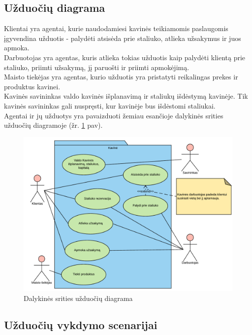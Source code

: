 \documentclass{VUMIFPSkursinis}
\begin{document}
\subsection{Užduočių diagrama}
Klientai  yra  agentai,  kurie  naudodamiesi  kavinės  teikiamomis 
paslaugomis  įgyvendina  užduotis - palydėti  atsisėda  prie  staliuko,  atlieka  užsakymus  ir  juos apmoka. \\
Darbuotojas yra agentas, kuris atlieka tokias užduotis kaip palydėti klientą prie staliuko, 
priimti užsakymą, jį paruošti ir priimti apmokėjimą.\\
Maisto tiekėjas yra agentas, kurio užduotis yra pristatyti reikalingas prekes ir produktus kavinei.\\
Kavinės savininkas valdo kavinės išplanavimą ir staliukų išdėstymą kavinėje. Tik kavinės savininkas gali nuspręsti, kur kavinėje bus išdėstomi staliukai.\\
Agentai ir jų užduotys yra pavaizduoti žemiau esančioje dalykinės srities užduočių diagramoje (žr. \ref{fig:diagrama2} pav).\\


	\begin {figure}[H]
	\centering
		\caption{Dalykinės srities užduočių diagrama}
		\includegraphics[scale=0.9]{img/3lab/Diagrama2}
		
		\label{fig:diagrama2}
	\end{figure}

\subsection{Užduočių vykdymo scenarijai}
\end{document}
